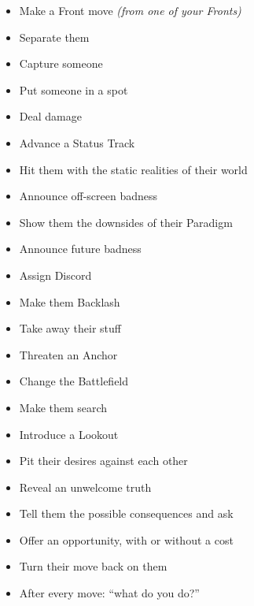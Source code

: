 \documentclass[letterpaper,10pt]{article}
\newcommand{\SECTION}[1]{\vspace{.5em}{\noindent\titlefont\LARGE\textbf{#1}}

}
\begin{document}
\SECTION{Your Moves}
\begin{itemize}
\item Make a Front move \textit{(from one of your Fronts)}
\item Separate them
\item Capture someone
\item Put someone in a spot
\item Deal damage
\item Advance a Status Track
\item Hit them with the static realities of their world
\item Announce off-screen badness
\item Show them the downsides of their Paradigm
\item Announce future badness
\item Assign Discord
\item Make them Backlash
\item Take away their stuff
\item Threaten an Anchor
\item Change the Battlefield
\item Make them search
\item Introduce a Lookout
\item Pit their desires against each other
\item Reveal an unwelcome truth
\item Tell them the possible consequences and ask
\item Offer an opportunity, with or without a cost
\item Turn their move back on them
\item After every move: ``what do you do?''
\end{itemize}
\end{document}
